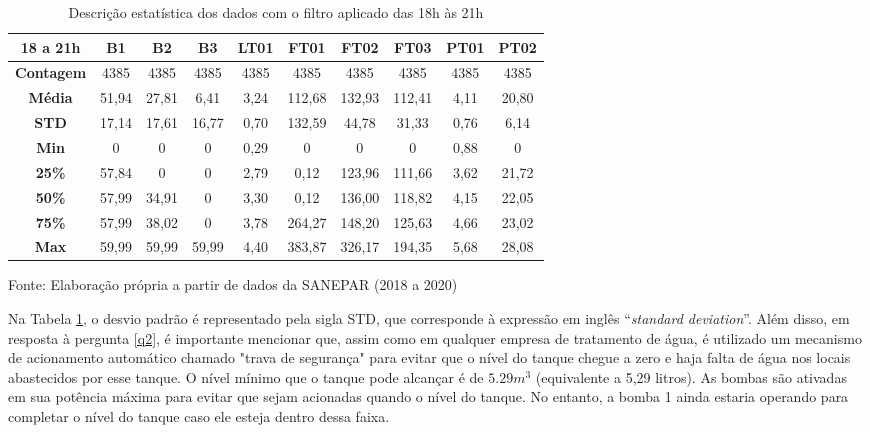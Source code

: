 \begin{table}[htp!]
	\centering
	\caption{Descrição estatística dos dados com o filtro aplicado das 18h às 21h}\label{tb:est}
	\begin{tabular}{@{}cccccccccc@{}}
		\toprule
		\textbf{18 a 21h}  & \textbf{B1} & \textbf{B2} & \textbf{B3} & \textbf{LT01} & \textbf{FT01} & \textbf{FT02} & \textbf{FT03} & \textbf{PT01} & \textbf{PT02} \\ \midrule
		\textbf{Contagem} & 4385    & 4385     & 4385     & 4385      & 4385       & 4385       & 4385       & 4385       & 4385       \\
		\textbf{Média}      & 51,94       & 27,81       & 6,41        & 3,24          & 112,68        & 132,93        & 112,41        & 4,11          & 20,80         \\
		\textbf{STD}       & 17,14       & 17,61       & 16,77       & 0,70          & 132,59        & 44,78         & 31,33         & 0,76          & 6,14          \\
		\textbf{Min}       & 0           & 0           & 0           & 0,29          & 0             & 0             & 0             & 0,88          & 0             \\
		\textbf{25\%}      & 57,84       & 0           & 0           & 2,79          & 0,12          & 123,96        & 111,66        & 3,62          & 21,72         \\
		\textbf{50\%}      & 57,99       & 34,91       & 0           & 3,30          & 0,12          & 136,00        & 118,82        & 4,15          & 22,05         \\
		\textbf{75\%}      & 57,99       & 38,02       & 0           & 3,78          & 264,27        & 148,20        & 125,63        & 4,66          & 23,02         \\
		\textbf{Max}       & 59,99       & 59,99       & 59,99       & 4,40          & 383,87        & 326,17        & 194,35        & 5,68          & 28,08         \\ \bottomrule
	\end{tabular}
	
	Fonte: Elaboração própria a partir de dados da SANEPAR (2018 a 2020)
\end{table}



Na Tabela \ref{tb:est}, o desvio padrão é representado pela sigla STD, que corresponde à expressão em inglês ``\textit{standard deviation}''. Além disso, em resposta à pergunta \ref{q2}, é importante mencionar que, assim como em qualquer empresa de tratamento de água, é utilizado um mecanismo de acionamento automático chamado "trava de segurança" para evitar que o nível do tanque chegue a zero e haja falta de água nos locais abastecidos por esse tanque. O nível mínimo que o tanque pode alcançar é de $5.29 m^3$ (equivalente a 5,29 litros). As bombas são ativadas em sua potência máxima para evitar que sejam acionadas quando o nível do tanque. No entanto, a bomba 1 ainda estaria operando para completar o nível do tanque caso ele esteja dentro dessa faixa.

